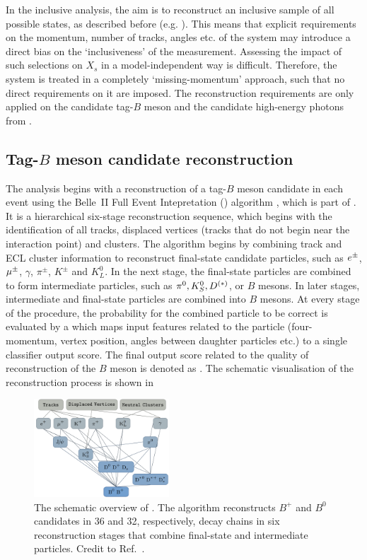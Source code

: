 
In the inclusive \BtoXsgamma analysis, the aim is to reconstruct an inclusive sample of all possible \Xs states, 
as described before (e.g. ).
This means that explicit requirements on the momentum, number of tracks, angles etc. of the \Xs system may introduce a direct bias on the `inclusiveness' of the measurement.
Assessing the impact of such selections on $X_s$ in a model-independent way is difficult.
Therefore, the \Xs system is treated in a completely `missing-momentum' approach, such that no direct requirements on it are imposed.
The reconstruction requirements are only applied on the candidate tag-$B$ meson and the candidate high-energy photons from \BtoXsgamma.
\subsection{Tag-\texorpdfstring{$B$}{B} meson candidate reconstruction}\label{sec:tag_reconstruction}

The analysis begins with a reconstruction of a tag-$B$ meson candidate in each event
using the Belle~II Full Event Intepretation (\FEI) algorithm \cite{Keck:2017mui,Keck:2018lcd}, which is part of \basftwo.
It is a hierarchical six-stage reconstruction sequence, which begins with the identification of all tracks, displaced vertices (tracks that do not begin near the interaction point) and \ECL clusters.
The algorithm begins by combining track and ECL cluster information to reconstruct final-state candidate particles,
such as $e^\pm$, $\mu^{\pm}$, $\gamma$,  $\pi^{\pm}$, $K^{\pm}$ and $K_L^0$.
In the next stage, the final-state particles are combined to form intermediate particles, such as $\pi^0, K_S^0, D^{(*)}$, or $B$ mesons.
In later stages, intermediate and final-state particles are combined into $B$ mesons.
At every stage of the procedure, the probability for the combined particle to be correct is evaluated by a \BDT
which maps input features related to the particle (four-momentum, vertex position, angles between daughter particles etc.) to a single classifier
output score. The final output score related to the quality of reconstruction of the $B$ meson is denoted as \feiProb. 
The schematic visualisation of the reconstruction process is shown in 
\begin{figure}[htbp!]
    \centering
    \includegraphics[width=0.45\textwidth]{figures/event_reconstruction/FEI_tagging.png}
    \caption{\label{fig:fei_schematic} 
    The schematic overview of \FEI.
    The algorithm reconstructs $B^+$ and $B^0$ candidates in 36 and 32, respectively, decay chains
    in six reconstruction stages that combine final-state and intermediate particles.
    Credit to Ref.~\cite{Keck:2018lcd}.
    }
\end{figure}

